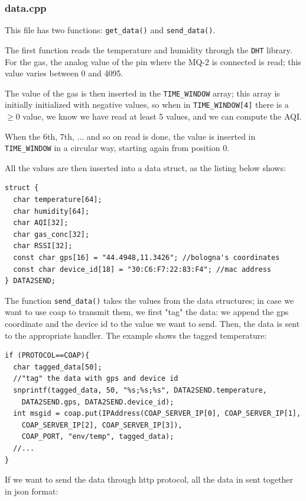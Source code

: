 \documentclass[]{article}
\begin{document}
\subsubsection{data.cpp}
This file has two functions: \texttt{get\_data()} and \texttt{send\_data()}.

The first function reads the temperature and humidity through the \texttt{DHT} library. For the gas, the analog value of the pin where the MQ-2 is connected is read; this value varies between 0 and 4095. \cite{tut:read}

The value of the gas is then inserted in the \texttt{TIME\_WINDOW} array; this array is initially initialized with negative values, so when in \texttt{TIME\_WINDOW[4]} there is a $ \ge 0 $ value, we know we have read at least 5 values, and we can compute the AQI.

When the 6th, 7th, ... and so on read is done, the value is inserted in \texttt{TIME\_WINDOW} in a circular way, starting again from position 0.

All the values are then inserted into a data struct, as the listing below shows:

\begin{lstlisting}[style=C++, caption=Loop function]
struct {
  char temperature[64];
  char humidity[64];
  char AQI[32];
  char gas_conc[32];
  char RSSI[32];
  const char gps[16] = "44.4948,11.3426"; //bologna's coordinates
  const char device_id[18] = "30:C6:F7:22:83:F4"; //mac address
} DATA2SEND;	
\end{lstlisting}

The function \texttt{send\_data()} takes the values from the data structures; in case we want to use coap to transmit them, we first "tag" the data: we append the gps coordinate and the device id to the value we want to send. Then, the data is sent to the appropriate handler.
The example shows the tagged temperature:

\begin{lstlisting}[style=C++, caption=Example of tagged  data (temperature) - coap protocol]
if (PROTOCOL==COAP){
  char tagged_data[50];
  //"tag" the data with gps and device id
  snprintf(tagged_data, 50, "%s;%s;%s", DATA2SEND.temperature, 
    DATA2SEND.gps, DATA2SEND.device_id);
  int msgid = coap.put(IPAddress(COAP_SERVER_IP[0], COAP_SERVER_IP[1], 
    COAP_SERVER_IP[2], COAP_SERVER_IP[3]),
    COAP_PORT, "env/temp", tagged_data);
  //...
}
\end{lstlisting}

If we want to send the data through http protocol, all the data in sent together in json format:
\end{document}
